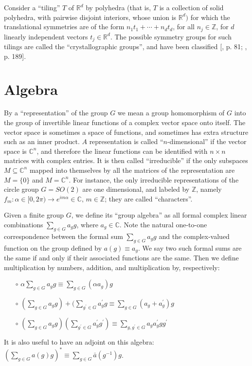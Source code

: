 \documentclass[reqno]{stml-l}
\theoremstyle{plain}
\theoremstyle{definition}
\numberwithin{equation}{chapter}
\begin{document}
Consider a ``tiling'' $T$ of $\mathbb{R}^{d}$ by polyhedra (that is, $T$ is a collection of solid polyhedra, with pairwise disjoint interiors, whose union is $\mathbb{R}^{d})$ for which the translational symmetries are of the form $n_{1}t_{1}+\cdots+n_{d}t_{d}$, for all $n_{j}\in \mathbb{Z}$, for $d$ linearly independent vectors $t_{j}\in \mathbb{R}^{d}$. The possible symmetry groups for such tilings are called the ``crystallographic groups'', and have been classified [, p. 81; , p. 189].


\chapter{Algebra \label{appII:appII}}

By a ``representation'' of the group $G$ we mean a group homomorphism of $G$ into the group of invertible linear functions of a complex vector space onto itself. The vector space is sometimes a space of functions, and sometimes has extra structure such as an inner product. $A$ representation is called ``$n$-dimensional'' if the vector space is $\mathbb{C}^{n}$, and therefore the linear functions can be identified with $n \times n$ matrices with complex entries. It is then called ``irreducible'' if the only subspaces $M\subseteq \mathbb{C}^{n}$ mapped into themselves by all the matrices of the representation are $M=\{0\}$ and $M=\mathbb{C}^{n}$. For instance, the only irreducible representations of the circle group $G=SO(2)$ are one dimensional, and labeled by $\mathbb{Z}$, namely $f_{m}:\alpha\in[0,2\pi)\rightarrow e^{im\alpha}\in \mathbb{C},\,m\in \mathbb{Z}$; they are called ``characters''.

Given a finite group $G$, we define its ``group algebra'' as all formal complex linear combinations $\sum\nolimits_{g\in G}a_{g}g$, where $a_{g}\in \mathbb{C}$. Note the natural one-to-one correspondence between the formal sum $\sum\nolimits_{g\in G}a_{g}g$ and the complex-valued function on the group defined by $a(g)\equiv a_{g}$. We say two such formal sums are the same if and only if their associated functions are the same. Then we define multiplication by numbers, addition, and multiplication by, respectively:
\begin{enumerate}
\item[$\circ$] $\alpha\sum\nolimits_{g\in G}a_{g}g\equiv\sum\nolimits_{g\in G}(\alpha a_{g})g$
\item[$\circ$] $(\sum\nolimits_{g\in G}a_{g}g)+(\sum\nolimits_{g^{\prime}\in G}a_{g}^{\prime}g\equiv\sum\nolimits_{g\in G}(a_{g}+a_{g}^{\prime})g$
\item[$\circ$] $(\sum\nolimits_{g\in G}a_{g}g)(\sum\nolimits_{g^{\prime}\in G}a_{g}^{\prime}g^{\prime})\equiv\sum\limits_{g,g^{\prime}\in G}a_{g}a_{g}^{\prime}gg^{\prime}$
\end{enumerate}
It is also useful to have an adjoint on this algebra: $(\sum\nolimits_{g\in G}a(g)g)^{\ast}\equiv \sum\nolimits_{g\in G}\bar{a}(g^{-1})g$.
\end{document}
